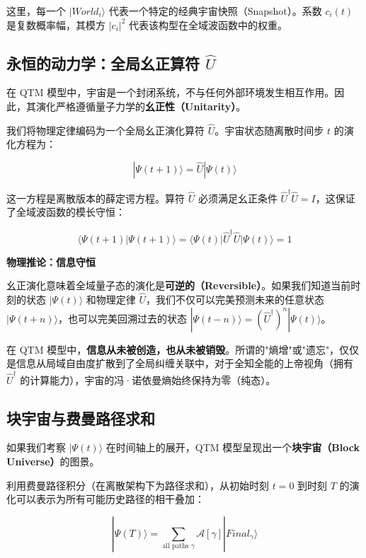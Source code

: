 这里，每一个 $|World_i\rangle$ 代表一个特定的经典宇宙快照（Snapshot）。系数 $c_i(t)$ 是复数概率幅，其模方 $|c_i|^2$ 代表该构型在全域波函数中的权重。

\subsection{永恒的动力学：全局幺正算符 $\hat{U}$}

在 QTM 模型中，宇宙是一个封闭系统，不与任何外部环境发生相互作用。因此，其演化严格遵循量子力学的\textbf{幺正性（Unitarity）}。

我们将物理定律编码为一个全局幺正演化算符 $\hat{U}$。宇宙状态随离散时间步 $t$ 的演化方程为：

\begin{equation}
|\Psi(t+1)\rangle = \hat{U} |\Psi(t)\rangle
\end{equation}

这一方程是离散版本的薛定谔方程。算符 $\hat{U}$ 必须满足幺正条件 $\hat{U}^\dagger \hat{U} = I$，这保证了全域波函数的模长守恒：

\begin{equation}
\langle \Psi(t+1) | \Psi(t+1) \rangle = \langle \Psi(t) | \hat{U}^\dagger \hat{U} | \Psi(t) \rangle = 1
\end{equation}

\textbf{物理推论：信息守恒}

幺正演化意味着全域量子态的演化是\textbf{可逆的（Reversible）}。如果我们知道当前时刻的状态 $|\Psi(t)\rangle$ 和物理定律 $\hat{U}$，我们不仅可以完美预测未来的任意状态 $|\Psi(t+n)\rangle$，也可以完美回溯过去的状态 $|\Psi(t-n)\rangle = (\hat{U}^\dagger)^n |\Psi(t)\rangle$。

在 QTM 模型中，\textbf{信息从未被创造，也从未被销毁}。所谓的"熵增"或"遗忘"，仅仅是信息从局域自由度扩散到了全局纠缠关联中，对于全知全能的上帝视角（拥有 $\hat{U}^\dagger$ 的计算能力），宇宙的冯·诺依曼熵始终保持为零（纯态）。

\subsection{块宇宙与费曼路径求和}

如果我们考察 $|\Psi(t)\rangle$ 在时间轴上的展开，QTM 模型呈现出一个\textbf{块宇宙（Block Universe）}的图景。

利用费曼路径积分（在离散架构下为路径求和），从初始时刻 $t=0$ 到时刻 $T$ 的演化可以表示为所有可能历史路径的相干叠加：

\begin{equation}
|\Psi(T)\rangle = \sum_{\text{all paths } \gamma} \mathcal{A}[\gamma] |Final_\gamma\rangle
\end{equation}

